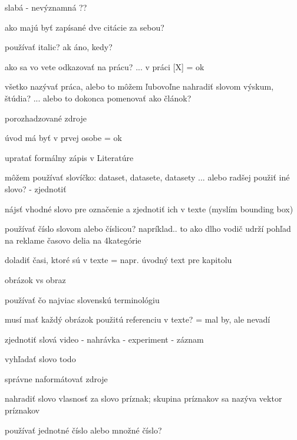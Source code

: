 slabá - nevýznamná ??

ako majú byť zapísané dve citácie za sebou?

používať italic? ak áno, kedy?

ako sa vo vete odkazovať na prácu? ... v práci [X]
= ok

všetko nazývať práca, alebo to môžem ľubovoľne nahradiť slovom výskum, štúdia? ... alebo to dokonca pomenovať ako článok?

porozhadzované zdroje

úvod má byť v prvej osobe
= ok

upratať formálny zápis v Literatúre

môžem používať slovíčko: dataset, datasete, datasety ... alebo radšej použiť iné slovo? - zjednotiť

nájsť vhodné slovo pre označenie a zjednotiť ich v texte (myslím bounding box)

používať číslo slovom alebo číslicou? napríklad.. to ako dlho vodič udrží pohľad na reklame časovo delia na 4 kategórie

doladiť časi, ktoré sú v texte
 = napr. úvodný text pre kapitolu

obrázok vs obraz

používať čo najviac slovenskú terminológiu

musí mať každý obrázok použitú referenciu v texte?
= mal by, ale nevadí

zjednotiť slová video - nahrávka - experiment - záznam

vyhľadať slovo todo

správne naformátovať zdroje

nahradiť slovo vlasnosť za slovo príznak; skupina príznakov sa nazýva vektor príznakov

používať jednotné číslo alebo množné číslo?



